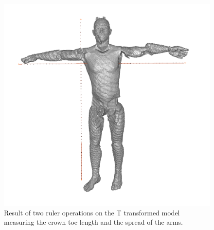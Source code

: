 \begin{figure} [!htb]
    \centering
	\includegraphics[width=16cm]{content/images/rulerResult.png}
	\caption{Result of two ruler operations on the T transformed model measuring the crown toe length and the spread of the arms.} 
	\label{fig:rulerResult}
\end{figure}